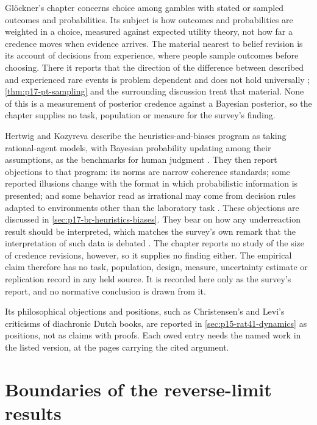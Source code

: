 Gl\"ockner's chapter concerns choice among gambles with stated or sampled
outcomes and probabilities. Its subject is how outcomes and probabilities
are weighted in a choice, measured against expected utility theory, not how
far a credence moves when evidence arrives. The material nearest to belief
revision is its account of decisions from experience, where people sample
outcomes before choosing. There it reports that the direction of the
difference between described and experienced rare events is problem
dependent and does not hold universally \cite[p.~490]{Glockner2021ProspectTheory};
\cref{thm:p17-pt-sampling} and the surrounding discussion treat that
material. None of this is a measurement of posterior credence against a
Bayesian posterior, so the chapter supplies no task, population or
measure for the survey's finding.

Hertwig and Kozyreva describe the heuristics-and-biases program as taking
rational-agent models, with Bayesian probability updating among their
assumptions, as the benchmarks for human judgment
\cite[p.~509]{HertwigKozyreva2021Bounded}. They then report objections to
that program: its norms are narrow coherence standards; some reported
illusions change with the format in which probabilistic information is
presented; and some behavior read as irrational may come from decision
rules adapted to environments other than the laboratory task
\cite[p.~510]{HertwigKozyreva2021Bounded}. These objections are discussed in
\cref{sec:p17-br-heuristics-biases}. They bear on how any underreaction
result should be interpreted, which matches the survey's own remark that
the interpretation of such data is debated \cite[p.~246]{HajekStaffel2021Dynamics}.
The chapter reports no study of the size of credence revisions, however,
so it supplies no finding either. The empirical claim therefore has no
task, population, design, measure, uncertainty estimate or replication
record in any held source. It is recorded here only as the survey's
report, and no normative conclusion is drawn from it.

Its philosophical objections and positions, such as
Christensen's and Levi's criticisms of diachronic Dutch books, are reported
in \cref{sec:p15-rat41-dynamics} as positions, not as claims with proofs.
Each owed entry needs the named work in the listed version, at the pages
carrying the cited argument.

\section{Boundaries of the reverse-limit results}
\label{sec:p15-w02b-p15-022-boundaries}

